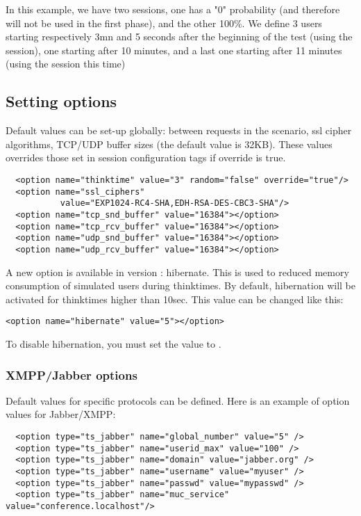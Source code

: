 \documentclass{TSUNG-en}
\begin{document}
In this example, we have two sessions, one has a "0" probability (and
therefore will not be used in the first phase), and the other
100\%. We define 3 users starting respectively 3mn and 5 seconds
after the beginning of the test (using the 
session), one starting after 10 minutes, and a last one starting after
11 minutes (using the  session this time)

\subsection{Setting options}

\par Default values can be set-up globally:  between requests
in the scenario,  ssl cipher algorithms, TCP/UDP buffer sizes (the default
value is 32KB). These values overrides
those set in session configuration tags if override is true.
\begin{Verbatim}
  <option name="thinktime" value="3" random="false" override="true"/>
  <option name="ssl_ciphers"
           value="EXP1024-RC4-SHA,EDH-RSA-DES-CBC3-SHA"/>
  <option name="tcp_snd_buffer" value="16384"></option>
  <option name="tcp_rcv_buffer" value="16384"></option>
  <option name="udp_snd_buffer" value="16384"></option>
  <option name="udp_rcv_buffer" value="16384"></option>
\end{Verbatim}

A new option is available in version : hibernate. This
is used to reduced memory consumption of simulated users during
thinktimes. By default, hibernation will be activated for thinktimes
higher than 10sec. This value can be changed like this:

\begin{Verbatim}
<option name="hibernate" value="5"></option>
\end{Verbatim}

To disable hibernation, you must set the value to .

\subsubsection{XMPP/Jabber options}
\label{sec:jabber-options}

Default values for specific protocols can be defined. Here is an
example of option values for Jabber/XMPP:

\begin{Verbatim}
  <option type="ts_jabber" name="global_number" value="5" />
  <option type="ts_jabber" name="userid_max" value="100" />
  <option type="ts_jabber" name="domain" value="jabber.org" />
  <option type="ts_jabber" name="username" value="myuser" />
  <option type="ts_jabber" name="passwd" value="mypasswd" />
  <option type="ts_jabber" name="muc_service" value="conference.localhost"/>
\end{Verbatim}
\end{document}
